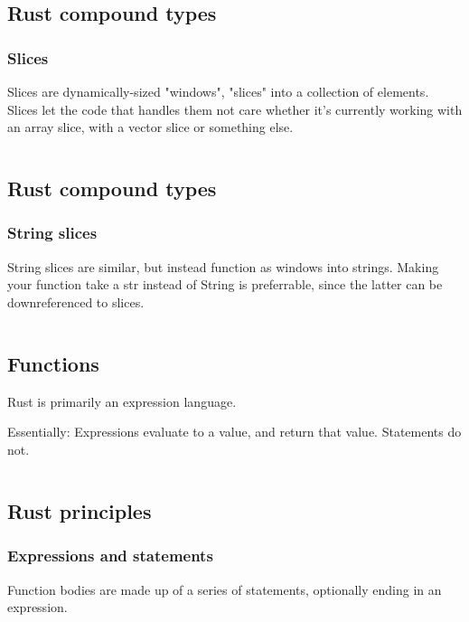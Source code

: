 \documentclass[usenames,twocolumn,dvipsnames,10pt,a4wide]{article}
\begin{document}
\inputminted[fontsize=\normalsize]{rust}{code/array.rs}



\subsection{Rust compound types}
\subsubsection{Slices}
Slices are dynamically-sized "windows", "slices" into a
collection of elements. Slices let the code that handles
them not care whether it's currently working with an
array slice, with a vector slice or something else.

\inputminted[fontsize=\normalsize]{rust}{code/slice.rs}



\subsection{Rust compound types}
\subsubsection{String slices}
String slices are similar, but instead function as windows
into strings. Making your function take a str instead of 
String is preferrable, since the latter can be
downreferenced to slices.

\inputminted[fontsize=\normalsize]{rust}{code/str.rs}



\subsection{Functions}
Rust is primarily an expression language.

Essentially: Expressions evaluate to a value, and
return that value. Statements do not.

\inputminted[fontsize=\normalsize]{rust}{code/expression1.rs}


\subsection{Rust principles}
\subsubsection{Expressions and statements}
\normalsize
Function bodies are made up of a series of statements, 
optionally ending in an expression.
\end{document}
